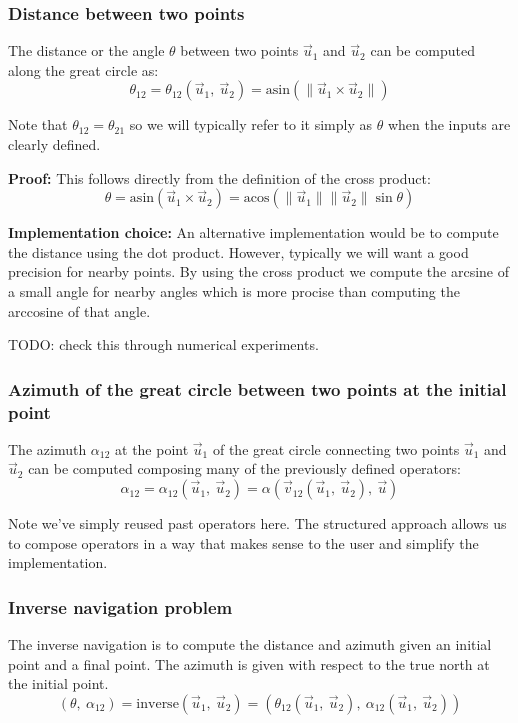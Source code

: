 \subsubsection{Distance between two points}
The distance or the angle $\theta$ between two points $\vec{u}_1$ and $\vec{u}_2$ can be computed along the great circle as:
\begin{equation}
    \theta_{12} = \theta_{12} (\vec{u}_1, \ \vec{u}_2) = \text{asin} (\|\vec{u}_1 \times \vec{u}_2\|)
\end{equation}

Note that $\theta_{12}=\theta_{21}$ so we will typically refer to it simply as $\theta$ when the inputs are clearly defined.

\textbf{{Proof:}}
This follows directly from the definition of the cross product:
\begin{equation}
    \theta = \text{asin} (\vec{u}_1 \times \vec{u}_2) = \text{acos} (\|\vec{u}_1 \| \|\vec{u}_2 \| \sin \theta)
\end{equation}

\textbf{{Implementation choice:}}
An alternative implementation would be to compute the distance using the dot product. However, typically we will want a good precision for nearby points. By using the cross product we compute the arcsine of a small angle for nearby angles which is more procise than computing the arccosine of that angle.

TODO: check this through numerical experiments.

\subsubsection{Azimuth of the great circle between two points at the initial point}
The azimuth $\alpha_{12}$ at the point $\vec{u}_1$ of the great circle connecting two points $\vec{u}_1$ and $\vec{u}_2$ can be computed composing many of the previously defined operators:
\begin{equation}
	\alpha_{12} = \alpha_{12} (\vec{u}_1, \ \vec{u}_2) = \alpha (\vec{v}_{12} (\vec{u}_1, \ \vec{u}_2), \ \vec{u})
\end{equation}

Note we've simply reused past operators here. The structured approach allows us to compose operators in a way that makes sense to the user and simplify the implementation.

\subsubsection{Inverse navigation problem}
The inverse navigation is to compute the distance and azimuth given an initial point and a final point. The azimuth is given with respect to the true north at the initial point.
\begin{equation}
    (\theta, \ \alpha_{12}) = \text{inverse} (\vec{u}_1, \ \vec{u}_2) = \left(\theta_{12} (\vec{u}_1, \ \vec{u}_2), \ \alpha_{12} (\vec{u}_1, \ \vec{u}_2) \right)
\end{equation}

